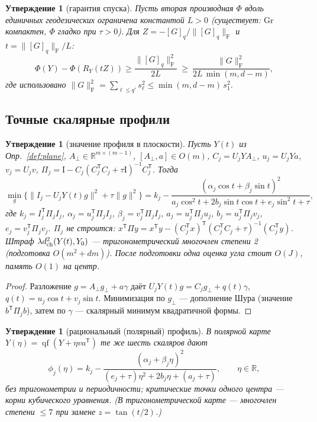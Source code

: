 \documentclass[11pt,a4paper]{article}
\newcommand{\R}{\mathbb R}
\newcommand{\Id}{\mathrm I}
\newcommand{\T}{^{\mathsf T}}
\newcommand{\F}{_{\mathrm F}}
\newcommand{\Gr}{\mathrm{Gr}}
\newcommand{\qf}{\operatorname{qf}}
\newtheorem{proposition}[theorem]{Утверждение}
\theoremstyle{remark}
\begin{document}
\begin{proposition}[гарантия спуска]\label{prop:descent}
Пусть вторая производная $\Phi$ вдоль единичных геодезических ограничена
константой $L>0$ (существует: $\Gr$ компактен, $\Phi$ гладко при $\tau>0$).
Для $Z=-[G]_q/\|[G]_q\|\F$ и $t=\|[G]_q\|\F/L$:
\begin{equation}\label{eq:descent}
 \Phi(Y)-\Phi(R_Y(tZ))\ge\frac{\|[G]_q\|\F^2}{2L}\ \ge\
 \frac{\|G\|\F^2}{2L\,\min(m,d-m)},
\end{equation}
где использовано $\|G\|\F^2=\sum_{\ell\le q'}s_\ell^2\le\min(m,d-m)\,s_1^2$.
\end{proposition}

\subsection{Точные скалярные профили}\label{sec:angles}

\begin{proposition}[значение профиля в плоскости]\label{prop:angleprofile}
Пусть $Y(t)$ из Опр.~\ref{def:plane}, $A_\perp\in\R^{m\times(m-1)}$,
 $[A_\perp,a]\in O(m)$, $C_j=U_jYA_\perp$, $u_j=U_jYa$, $v_j=U_jv$,
 $\Pi_j=\Id-C_j(C_j\T C_j+\tau\Id)^{-1}C_j\T$. Тогда
\begin{equation}\label{eq:angleprofile}
 \min_g\bigl\{\|I_j-U_jY(t)g\|^2+\tau\|g\|^2\bigr\}
 =k_j-\frac{(\alpha_j\cos t+\beta_j\sin t)^2}
 {a_j\cos^2t+2b_j\sin t\cos t+e_j\sin^2t+\tau},
\end{equation}
где $k_j=I_j\T\Pi_jI_j$, $\alpha_j=u_j\T\Pi_jI_j$, $\beta_j=v_j\T\Pi_jI_j$,
 $a_j=u_j\T\Pi_ju_j$, $b_j=u_j\T\Pi_jv_j$, $e_j=v_j\T\Pi_jv_j$.
 $\Pi_j$ не строится: $x\T\Pi y=x\T y-(C_j\T x)\T(C_j\T C_j+\tau)^{-1}(C_j\T y)$.
Штраф $\lambda d_{\rm ch}^2(Y(t),Y_0)$ --- тригонометрический многочлен
степени 2 (подготовка $O(m^2+dm)$). После подготовки одна оценка угла стоит
 $O(J)$, память $O(1)$ на центр.
\end{proposition}
\begin{proof}
Разложение $g=A_\perp g_\perp+a\gamma$ даёт
 $U_jY(t)g=C_jg_\perp+q(t)\gamma$, $q(t)=u_j\cos t+v_j\sin t$.
Минимизация по $g_\perp$ --- дополнение Шура (значение
 $b\T\Pi_jb$), затем по $\gamma$ --- скалярный минимум квадратичной формы.
\end{proof}

\begin{proposition}[рациональный (полярный) профиль]\label{prop:rational}
В полярной карте $Y(\eta)=\qf(Y+\eta va\T)$ те же шесть скаляров дают
\begin{equation}\label{eq:anglepolar}
 \phi_j(\eta)=k_j-\frac{(\alpha_j+\beta_j\eta)^2}
 {(e_j+\tau)\eta^2+2b_j\eta+(a_j+\tau)},\qquad \eta\in\R,
\end{equation}
без тригонометрии и периодичности; критические точки одного центра ---
корни кубического уравнения. (В тригонометрической карте --- многочлен
степени $\le7$ при замене $z=\tan(t/2)$.)
\end{proposition}
\end{document}
